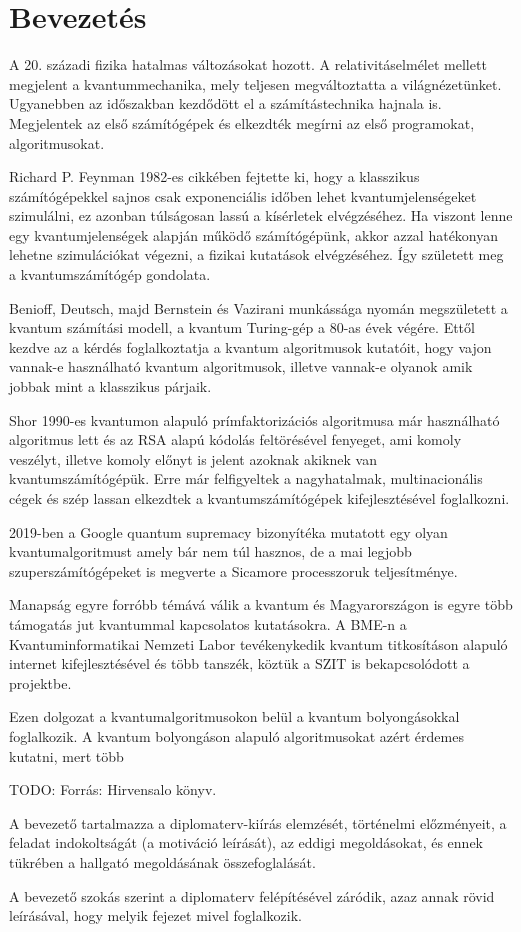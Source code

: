 \chapter{Bevezetés}

A 20. századi fizika hatalmas változásokat hozott. A relativitáselmélet mellett
megjelent a kvantummechanika, mely teljesen megváltoztatta a világnézetünket.
Ugyanebben az időszakban kezdődött el a számítástechnika hajnala is. Megjelentek
az első számítógépek és elkezdték megírni az első programokat, algoritmusokat.

Richard P. Feynman 1982-es cikkében fejtette ki, hogy a klasszikus számítógépekkel
sajnos csak exponenciális időben lehet kvantumjelenségeket szimulálni, ez azonban
túlságosan lassú a kísérletek elvégzéséhez. Ha viszont lenne egy kvantumjelenségek
alapján működő számítógépünk, akkor azzal hatékonyan lehetne szimulációkat végezni,
a fizikai kutatások elvégzéséhez. Így született meg a kvantumszámítógép gondolata.

Benioff, Deutsch, majd Bernstein és Vazirani munkássága nyomán megszületett a
kvantum számítási modell, a kvantum Turing-gép a 80-as évek végére. Ettől kezdve
az a kérdés foglalkoztatja a kvantum algoritmusok kutatóit, hogy vajon vannak-e
használható kvantum algoritmusok, illetve vannak-e olyanok amik jobbak mint a
klasszikus párjaik.

Shor 1990-es kvantumon alapuló prímfaktorizációs algoritmusa már használható
algoritmus lett és az RSA alapú kódolás feltörésével fenyeget, ami komoly
veszélyt, illetve komoly előnyt is jelent azoknak akiknek van kvantumszámítógépük.
Erre már felfigyeltek a nagyhatalmak, multinacionális cégek és szép lassan elkezdtek
a kvantumszámítógépek kifejlesztésével foglalkozni.

2019-ben a Google quantum supremacy bizonyítéka mutatott egy olyan kvantumalgoritmust
amely bár nem túl hasznos, de a mai legjobb szuperszámítógépeket is megverte a
Sicamore processzoruk teljesítménye.

Manapság egyre forróbb témává válik a kvantum és Magyarországon is egyre több
támogatás jut kvantummal kapcsolatos kutatásokra. A BME-n a Kvantuminformatikai
Nemzeti Labor tevékenykedik kvantum titkosításon alapuló internet kifejlesztésével
és több tanszék, köztük a SZIT is bekapcsolódott a projektbe.

Ezen dolgozat a kvantumalgoritmusokon belül a kvantum bolyongásokkal foglalkozik.
A kvantum bolyongáson alapuló algoritmusokat azért érdemes kutatni, mert
több

TODO: Forrás: Hirvensalo könyv.


A bevezető tartalmazza a diplomaterv-kiírás elemzését, történelmi előzményeit,
a feladat indokoltságát (a motiváció leírását), az eddigi megoldásokat, és
ennek tükrében a hallgató megoldásának összefoglalását.

A bevezető szokás szerint a diplomaterv felépítésével záródik, azaz annak
rövid leírásával, hogy melyik fejezet mivel foglalkozik.
